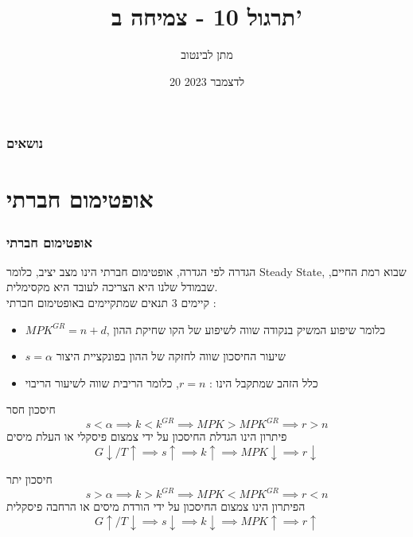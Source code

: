 \documentclass[usenames,dvipsnames]{beamer}
\title{תרגול 10 - צמיחה ב'}
\author{\texthebrew{ מתן לבינטוב}}
\institute[{{ אב"ג}}]{{ אוניברסיטת בן גוריון בנגב}}
\date{20 לדצמבר 2023}
\begin{document}
\begin{RTL}
\begin{frame}
\titlepage
\end{frame}
\begin{frame}
    \frametitle{נושאים}
    \tableofcontents
\end{frame}

\section{אופטימום חברתי}


\begin{frame}[allowframebreaks]
    \frametitle{אופטימום חברתי}
    \begin{block}{הגדרה}
        לפי הגדרה, אופטימום חברתי הינו מצב יציב, כלומר Steady State, שבוא רמת החיים, שבמודל שלנו היא הצריכה לעובד היא מקסימלית. \\
        קיימים 3 תנאים שמתקיימים באופטימום חברתי : 
        \begin{itemize}
            \item $MPK^{GR} = n + d  $, כלומר שיפוע המשיק בנקודה שווה לשיפוע של הקו שחיקת ההון
            \item $s = \alpha$ שיעור החיסכון שווה לחזקה של ההון בפונקציית היצור
            \item כלל הזהב שמתקבל הינו : $r = n$, כלומר הריבית שווה לשיעור הריבוי
        \end{itemize}  
    \end{block}

    \framebreak

    \begin{alertblock}{חיסכון חסר}
        $$s < \alpha \implies k < k^{GR} \implies MPK > MPK^{GR} \implies r > n$$
        פיתרון הינו הגדלת החיסכון על ידי צמצום פיסקלי או העלת מיסים 
        $$G \downarrow  / T \uparrow \implies s \uparrow \implies k \uparrow \implies MPK \downarrow \implies r \downarrow$$
    \end{alertblock}

    \begin{exampleblock}{חיסכון יתר}
        $$s > \alpha \implies k > k^{GR} \implies MPK < MPK^{GR} \implies r < n$$   
        הפיתרון הינו צמצום החיסכון על ידי הורדת מיסים או הרחבה פיסקלית
        $$G \uparrow  / T \downarrow \implies s \downarrow \implies k \downarrow \implies MPK \uparrow \implies r \uparrow$$
    \end{exampleblock}
    

\end{frame}


\end{RTL}
\end{document}
